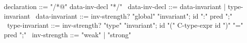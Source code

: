 \begin{syntax}
  declaration ::= "/*@" data-inv-decl "*/"
  \
  data-inv-decl ::= data-invariant | type-invariant
  \
  data-invariant ::= {inv-strength?} "global" "invariant";
                      id ":" pred ";"
  \
  type-invariant ::= {inv-strength?} "type" "invariant";
                      id "(" C-type-expr id ")" "=" pred ";"
  \
  {inv-strength} ::= { "weak" } | { "strong" }
\end{syntax}